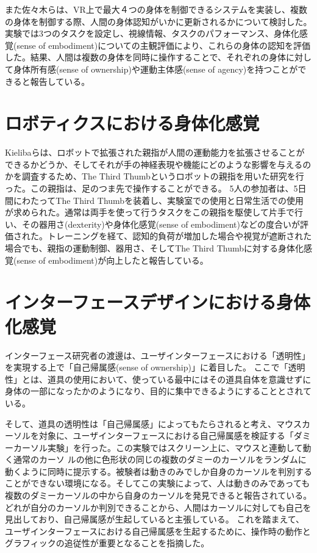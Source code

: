 また佐々木ら\cite{sasaki2022multisoma}は、VR上で最大４つの身体を制御できるシステムを実装し、複数の身体を制御する際、人間の身体認知がいかに更新されるかについて検討した。実験では3つのタスクを設定し、視線情報、タスクのパフォーマンス、身体化感覚(sense of embodiment)についての主観評価により、これらの身体の認知を評価した。結果、人間は複数の身体を同時に操作することで、それぞれの身体に対して身体所有感(sense of ownership)や運動主体感(sense of agency)を持つことができると報告している。

\section{ロボティクスにおける身体化感覚}

Kielibaら\cite{kieliba2021robotic}は、ロボットで拡張された親指が人間の運動能力を拡張させることができるかどうか、そしてそれが手の神経表現や機能にどのような影響を与えるのかを調査するため、The Third Thumbというロボットの親指を用いた研究を行った。この親指は、足のつま先で操作することができる。
5人の参加者は、5日間にわたってThe Third Thumbを装着し、実験室での使用と日常生活での使用が求められた。通常は両手を使って行うタスクをこの親指を駆使して片手で行い、その器用さ(dexterity)や身体化感覚(sense of embodiment)などの度合いが評価された。トレーニングを経て、認知的負荷が増加した場合や視覚が遮断された場合でも、親指の運動制御、器用さ、そしてThe Third Thumbに対する身体化感覚(sense of embodiment)が向上したと報告している。

\section{インターフェースデザインにおける身体化感覚}
インターフェース研究者の渡邊は、ユーザインターフェースにおける「透明性」を実現する上で「自己帰属感(sense of ownership)」に着目した\cite{Watanabe2017}。
ここで「透明性」とは、道具の使用において、使っている最中にはその道具自体を意識せずに身体の一部になったかのようになり、目的に集中できるようにすることとされている。

そして、道具の透明性は「自己帰属感」によってもたらされると考え、マウスカーソルを対象に、ユーザインターフェースにおける自己帰属感を検証する「ダミーカーソル実験」を行った\cite{Watanabe2013}。この実験ではスクリーン上に、マウスと連動して動く通常のカーソ
ルの他に色形状の同じの複数のダミーのカーソルをランダムに動くように同時に提示する。被験者は動きのみでしか自身のカーソルを判別することができない環境になる。そしてこの実験によって、人は動きのみであっても複数のダミーカーソルの中から自身のカーソルを発見できると報告されている。どれが自分のカーソルか判別できることから、人間はカーソルに対しても自己を見出しており、自己帰属感が生起していると主張している。
これを踏まえて、ユーザインターフェースにおける自己帰属感を生起するために、操作時の動作とグラフィックの追従性が重要となることを指摘した。

